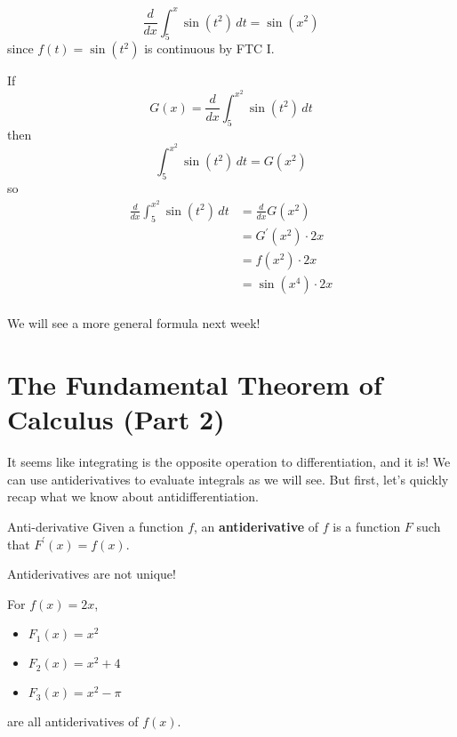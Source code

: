 \begin{Example}{}{}
    \[ \frac{d}{dx}\int_{5}^{x} \sin(t^2)\, d{t}
        =\sin(x^2) \]
    since $ f(t)=\sin(t^2) $ is continuous by FTC I.
\end{Example}

\begin{Example}{}{}
    If
    \[ G(x)=\frac{d}{dx}\int_{5}^{x^2} \sin(t^2)\, d{t} \]
    then
    \[ \int_{5}^{x^2} \sin(t^2)\, d{t}=G(x^2) \]
    so
    \begin{align*}
        \frac{d}{dx} \int_{5}^{x^2} \sin(t^2)\, d{t}
         & =\frac{d}{dx} G(x^2)   \\
         & =G^\prime(x^2)\cdot 2x \\
         & =f(x^2)\cdot 2x        \\
         & =\sin(x^4)\cdot 2x     \\
    \end{align*}
\end{Example}

We will see a more general formula next week!

\section{The Fundamental Theorem of Calculus (Part 2)}
It seems like integrating is the opposite operation to
differentiation, and it is! We can use antiderivatives
to evaluate integrals as we will see. But first, let's
quickly recap what we know about antidifferentiation.

\begin{Definition}{Anti-derivative}{}
    Given a function $ f $, an \textbf{antiderivative} of
    $ f $ is a function $ F $ such that $ F^\prime(x)=f(x) $.
\end{Definition}

\begin{Remark}{}{}
    Antiderivatives are not unique!
\end{Remark}

\begin{Example}{}{}
    For $ f(x)=2x $,
    \begin{itemize}
        \item $ F_1(x)=x^2 $
        \item $ F_2(x)=x^2+4 $
        \item $ F_3(x)=x^2-\pi $
    \end{itemize}
    are all antiderivatives of $ f(x) $.
\end{Example}

